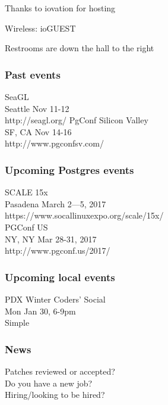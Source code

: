 \documentclass{beamer}
\begin{document}

\frame
{
  \begin{center}
  \item[]Thanks to iovation for hosting
  \item[]Wireless: ioGUEST
  \item[]Restrooms are down the hall to the right
  \end{center}
}

\frame
{
  \frametitle{Past events}
  \begin{center}
  {\large SeaGL\\}
Seattle Nov 11-12\\
http://seagl.org/
  \vspace{5mm}
 {\large PgConf Silicon Valley\\}
SF, CA Nov 14-16\\
http://www.pgconfsv.com/\\
  \end{center}
}

\frame
{
  \frametitle{Upcoming Postgres events}
  \begin{center}
 {\large SCALE 15x\\}
Pasadena March 2—5, 2017\\
https://www.socallinuxexpo.org/scale/15x/\\
  \vspace{5mm}
 {\large PGConf US\\}
NY, NY Mar 28-31, 2017\\
http://www.pgconf.us/2017/\\
  \vspace{5mm}
  \end{center}
}

\frame
{
  \frametitle{Upcoming local events}
  \begin{center}
 {\large PDX Winter Coders' Social\\}
Mon Jan 30, 6-9pm\\
Simple\\
  \vspace{5mm}
  \end{center}
}

\frame
{
  \frametitle{News}
  \begin{center}
Patches reviewed or accepted?\\
Do you have a new job?\\
Hiring/looking to be hired?\\
  \end{center}
}
\end{document}
